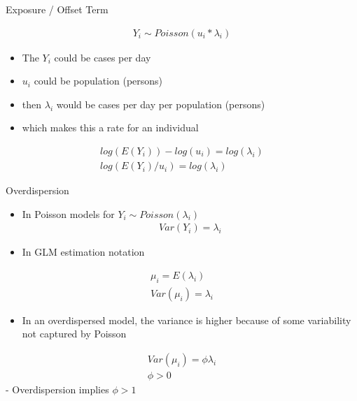 \documentclass[ignorenonframetext,]{beamer}
\providecommand{\tightlist}{%
  \setlength{\itemsep}{0pt}\setlength{\parskip}{0pt}}
\begin{document}
\begin{frame}{Exposure / Offset Term}

\[
\begin{aligned}
Y_i \sim Poisson(u_i * \lambda_i)
\end{aligned}
\]

\begin{itemize}
\tightlist
\item
  The \(Y_i\) could be cases per day
\item
  \(u_i\) could be population (persons)
\item
  then \(\lambda_i\) would be cases per day per population (persons)
\item
  which makes this a rate for an individual
\end{itemize}

\[
\begin{aligned}
log(E(Y_i)) - log(u_i) = log(\lambda_i) \\
log(E(Y_i)/ u_i) = log(\lambda_i)
\end{aligned}
\]

\end{frame}

\begin{frame}{Overdispersion}

\begin{itemize}
\item
  In Poisson models for \(Y_i \sim Poisson(\lambda_i)\) \[
  \begin{aligned}
  Var(Y_i) = \lambda_i
  \end{aligned}
  \]
\item
  In GLM estimation notation
\end{itemize}

\[
\begin{aligned}
\mu_i = E(\lambda_i) \\
Var(\mu_i) = \lambda_i
\end{aligned}
\]

\begin{itemize}
\tightlist
\item
  In an overdispersed model, the variance is higher because of some
  variability not captured by Poisson
\end{itemize}

\[
\begin{aligned}
Var(\mu_i) = \phi\lambda_i  \\ \phi > 0 
\end{aligned}
\] - Overdispersion implies \(\phi>1\)

\end{frame}
\end{document}
